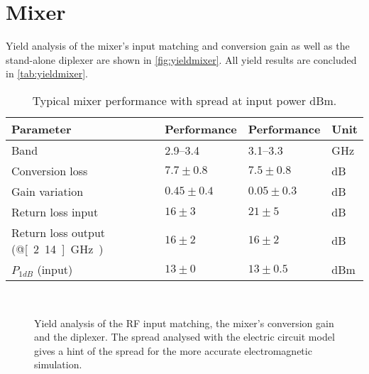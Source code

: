 	\section{Mixer}
		Yield analysis of the mixer's input matching and conversion gain as well as the stand-alone diplexer are shown in \autoref{fig:yieldmixer}. All yield results are concluded in \autoref{tab:yieldmixer}.

		\begin{table}[hbt!]
			\caption[Mixer performance with spread.]{Typical mixer performance with spread at input power \unit[-2]{dBm}.}
			\label{tab:yieldmixer}
			\centering
			\begin{tabular}{ l l l l } \toprule
				Parameter & Performance & Performance & Unit \\\midrule
				Band & 2.9--3.4 & 3.1--3.3 & GHz \\\midrule
				Conversion loss & $7.7\pm 0.8$ & $7.5\pm 0.8$ & dB \\
				Gain variation & $0.45\pm 0.4$ & $0.05\pm 0.3$ & dB \\
				Return loss input & $16\pm 3$ & $21\pm 5$ & dB \\
				Return loss output (@\unit[2.14]{GHz}) & $16\pm 2$ & $16\pm 2$ & dB \\
				$P_{1dB}$ (input) & $13\pm 0$ & $13\pm 0.5$ & dBm \\\bottomrule
			\end{tabular}
		\end{table}

		\begin{figure}[hbt!]
			\centering
			\\
			\caption[Mixer yield analysis.]{Yield analysis of  the RF input matching,  the mixer's conversion gain and  the diplexer. The spread analysed with the electric circuit model gives a hint of the spread for the more accurate electromagnetic simulation.}\label{fig:yieldmixer}
		\end{figure}


